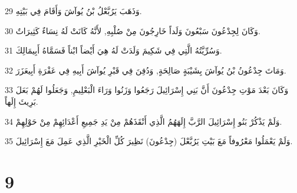 \par 29 وَذَهَبَ يَرُبَّعْلُ بْنُ يُوآشَ وَأَقَامَ فِي بَيْتِهِ.
\par 30 وَكَانَ لِجِدْعُونَ سَبْعُونَ وَلَداً خَارِجُونَ مِنْ صُلْبِهِ, لأَنَّهُ كَانَتْ لَهُ نِسَاءٌ كَثِيرَاتٌ.
\par 31 وَسُرِّيَّتُهُ الَّتِي فِي شَكِيمَ وَلَدَتْ لَهُ هِيَ أَيْضاً ابْناً فَسَمَّاهُ أَبِيمَالِكَ.
\par 32 وَمَاتَ جِدْعُونُ بْنُ يُوآشَ بِشَيْبَةٍ صَالِحَةٍ, وَدُفِنَ فِي قَبْرِ يُوآشَ أَبِيهِ فِي عَفْرَةِ أَبِيعَزَرَ.
\par 33 وَكَانَ بَعْدَ مَوْتِ جِدْعُونَ أَنَّ بَنِي إِسْرَائِيلَ رَجَعُوا وَزَنُوا وَرَاءَ الْبَعْلِيمِ, وَجَعَلُوا لَهُمْ بَعَلَ بَرِيثَ إِلَهاً.
\par 34 وَلَمْ يَذْكُرْ بَنُو إِسْرَائِيلَ الرَّبَّ إِلَهَهُمُ الَّذِي أَنْقَذَهُمْ مِنْ يَدِ جَمِيعِ أَعْدَائِهِمْ مِنْ حَوْلِهِمْ.
\par 35 وَلَمْ يَعْمَلُوا مَعْرُوفاً مَعَ بَيْتِ يَرُبَّعْلَ (جِدْعُونَ) نَظِيرَ كُلِّ الْخَيْرِ الَّذِي عَمِلَ مَعَ إِسْرَائِيلَ.

\chapter{9}

